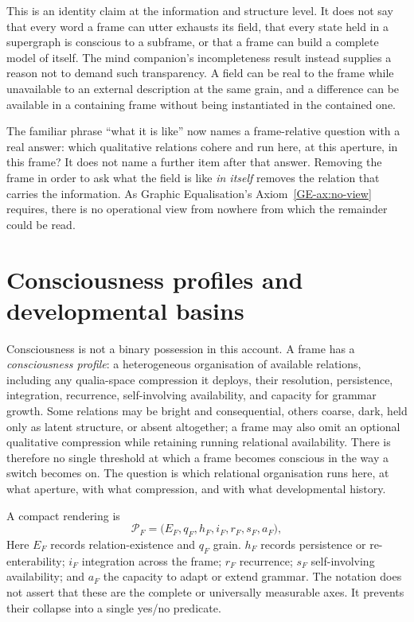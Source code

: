 \documentclass[11pt,a4paper]{article}
\theoremstyle{remark}\newtheorem{remark}[definition]{Remark}
\begin{document}
This is an identity claim at the information and structure level. It does not say
that every word a frame can utter exhausts its field, that every state held in a
supergraph is conscious to a subframe, or that a frame can build a complete model
of itself. The mind companion's incompleteness result instead supplies a reason not
to demand such transparency. A field can be real to the frame while unavailable to
an external description at the same grain, and a difference can be available in a
containing frame without being instantiated in the contained one.

The familiar phrase ``what it is like'' now names a frame-relative question with a
real answer: which qualitative relations cohere and run here, at this aperture,
in this frame? It does not name a further item after that answer. Removing the
frame in order to ask what the field is like \emph{in itself} removes the relation
that carries the information. As Graphic Equalisation's Axiom~\ref{GE-ax:no-view}
requires, there is no operational view from nowhere from which the remainder could
be read.

\section{Consciousness profiles and developmental basins}\label{sec:profiles}

Consciousness is not a binary possession in this account. A frame has a
\emph{consciousness profile}: a heterogeneous organisation of available relations,
including any qualia-space compression it deploys, their resolution, persistence,
integration, recurrence, self-involving availability, and capacity for grammar
growth. Some relations may be bright and consequential, others coarse, dark, held
only as latent structure, or absent altogether; a frame may also omit an optional
qualitative compression while retaining running relational availability. There is
therefore no single threshold at which a frame becomes conscious in the way a
switch becomes on. The question is which relational organisation runs here, at
what aperture, with what compression, and with what developmental history.

A compact rendering is
\[
\mathcal{P}_F=\bigl(E_F, q_F, h_F, i_F, r_F, s_F, a_F\bigr),
\]
Here $E_F$ records relation-existence and $q_F$ grain. $h_F$ records
persistence or re-enterability; $i_F$ integration across the frame; $r_F$
recurrence; $s_F$ self-involving availability; and $a_F$ the capacity to adapt
or extend grammar.
The notation does not assert that these are the complete or universally measurable
axes. It prevents their collapse into a single yes/no predicate.
\end{document}
